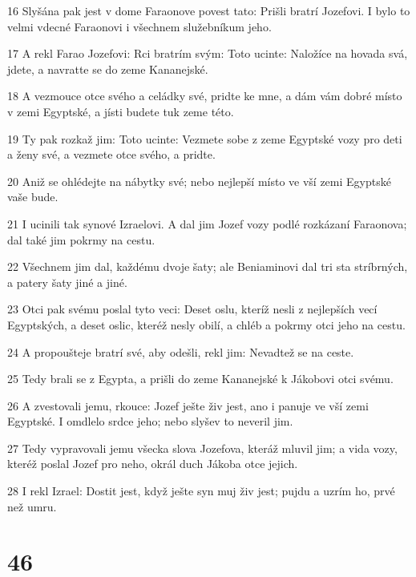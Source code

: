 \par 16 Slyšána pak jest v dome Faraonove povest tato: Prišli bratrí Jozefovi. I bylo to velmi vdecné Faraonovi i všechnem služebníkum jeho.
\par 17 A rekl Farao Jozefovi: Rci bratrím svým: Toto ucinte: Naložíce na hovada svá, jdete, a navratte se do zeme Kananejské.
\par 18 A vezmouce otce svého a celádky své, pridte ke mne, a dám vám dobré místo v zemi Egyptské, a jísti budete tuk zeme této.
\par 19 Ty pak rozkaž jim: Toto ucinte: Vezmete sobe z zeme Egyptské vozy pro deti a ženy své, a vezmete otce svého, a pridte.
\par 20 Aniž se ohlédejte na nábytky své; nebo nejlepší místo ve vší zemi Egyptské vaše bude.
\par 21 I ucinili tak synové Izraelovi. A dal jim Jozef vozy podlé rozkázaní Faraonova; dal také jim pokrmy na cestu.
\par 22 Všechnem jim dal, každému dvoje šaty; ale Beniaminovi dal tri sta stríbrných, a patery šaty jiné a jiné.
\par 23 Otci pak svému poslal tyto veci: Deset oslu, kteríž nesli z nejlepších vecí Egyptských, a deset oslic, kteréž nesly obilí, a chléb a pokrmy otci jeho na cestu.
\par 24 A propoušteje bratrí své, aby odešli, rekl jim: Nevadtež se na ceste.
\par 25 Tedy brali se z Egypta, a prišli do zeme Kananejské k Jákobovi otci svému.
\par 26 A zvestovali jemu, rkouce: Jozef ješte živ jest, ano i panuje ve vší zemi Egyptské. I omdlelo srdce jeho; nebo slyšev to neveril jim.
\par 27 Tedy vypravovali jemu všecka slova Jozefova, kteráž mluvil jim; a vida vozy, kteréž poslal Jozef pro neho, okrál duch Jákoba otce jejich.
\par 28 I rekl Izrael: Dostit jest, když ješte syn muj živ jest; pujdu a uzrím ho, prvé než umru.

\chapter{46}

